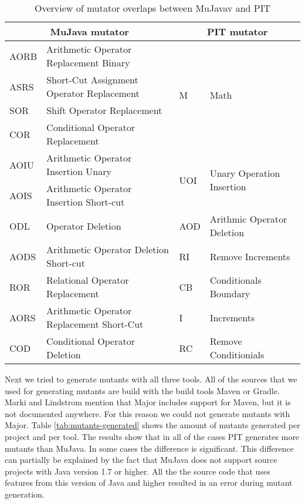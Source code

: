 \documentclass[../main]{subfiles}
\begin{document}
\begin{table}[htb]
\centering
\begin{tabular}{|l|l|l|l|}
\hline
\multicolumn{2}{|c|}{\textbf{ MuJava mutator}}      & \multicolumn{2}{c|}{\textbf{PIT mutator}}                         \\ \hline
AORB & Arithmetic Operator Replacement Binary      & \multirow{4}{*}{M}   & \multirow{4}{*}{Math}                      \\ \cline{1-2}
ASRS & Short-Cut Assignment   Operator Replacement &                      &                                            \\ \cline{1-2}
SOR  & Shift Operator   Replacement                &                      &                                            \\ \cline{1-2}
COR  & Conditional Operator   Replacement          &                      &                                            \\ \hline
AOIU & Arithmetic Operator   Insertion Unary       & \multirow{2}{*}{UOI} & \multirow{2}{*}{Unary Operation Insertion} \\ \cline{1-2}
AOIS & Arithmetic Operator   Insertion Short-cut   &                      &                                            \\ \hline
ODL  & Operator Deletion                           & AOD                  & Arithmic Operator   Deletion               \\ \hline
AODS & Arithmetic Operator   Deletion Short-cut    & RI                   & Remove Increments                          \\ \hline
ROR  & Relational Operator   Replacement           & CB                   & Conditionals Boundary                      \\ \hline
AORS & Arithmetic Operator   Replacement Short-Cut & I                    & Increments                                 \\ \hline
COD  & Conditional Operator   Deletion             & RC                   & Remove Conditionials                       \\ \hline

\end{tabular}
\caption{\label{tab:mutators-overlap}Overview of mutator overlaps between  MuJavav and PIT}
\end{table}
Next we tried to generate mutants with all three tools. 
All of the sources that we used for generating mutants are build with the build tools Maven or Gradle. 
Marki and Lindstrom\cite{Marki2017MutationJava} mention that Major includes support for Maven, but it is not documented anywhere.
For this reason we could not generate mutants with Major.
Table \ref{tab:mutants-generated} shows the amount of mutants generated per project and per tool. The results show that in all of the cases PIT generates more mutants than MuJava. In some cases the difference is significant. This difference can partially be explained by the fact that MuJava does not support source projects with Java version 1.7 or higher\cite{mujava}. All the the source code that uses features from this version of Java and higher resulted in an error during mutant generation.
\end{document}
